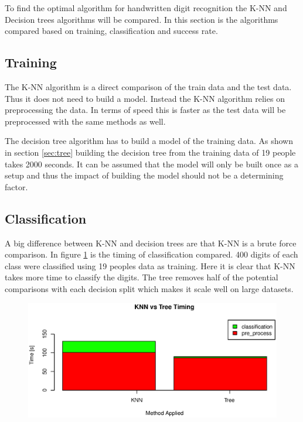 To find the optimal algorithm for handwritten digit recognition the K-NN and Decision trees algorithms will be compared.
In this section is the algorithms compared based on training, classification and success rate.

\subsection{Training}
The K-NN algorithm is a direct comparison of the train data and the test data.
Thus it does not need to build a model.
Instead the K-NN algorithm relies on preprocessing the data.
In terms of speed this is faster as the test data will be preprocessed with the same methods as well.

The decision tree algorithm has to build a model of the training data. 
As shown in section \ref{sec:tree} building the decision tree from the training data of 19 people takes 2000 seconds.
It can be assumed that the model will only be built once as a setup and thus the impact of building the model should not be a determining factor.

\subsection{Classification}
A big difference between K-NN and decision trees are that K-NN is a brute force comparison.
In figure \ref{fig:algo_compare_timing} is the timing of classification compared.
400 digits of each class were classified using 19 peoples data as training.
Here it is clear that K-NN takes more time to classify the digits.
The tree removes half of the potential comparisons with each decision split which makes it scale well on large datasets.

\begin{figure}[H]
\centering
\includegraphics[width=\textwidth]{graphics/algo_compare_timing}
\label{fig:algo_compare_timing}
\end{figure}

